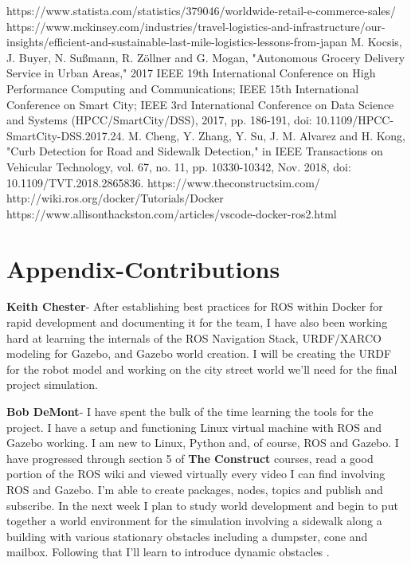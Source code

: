 \documentclass{article}
\begin{document}
\begin{multicols}{2}

\begin{thebibliography}{10}
 https://www.statista.com/statistics/379046/worldwide-retail-e-commerce-sales/
https://www.mckinsey.com/industries/travel-logistics-and-infrastructure/our-insights/efficient-and-sustainable-last-mile-logistics-lessons-from-japan
M. Kocsis, J. Buyer, N. Sußmann, R. Zöllner and G. Mogan, "Autonomous Grocery Delivery Service in Urban Areas," 2017 IEEE 19th International Conference on High Performance Computing and Communications; IEEE 15th International Conference on Smart City; IEEE 3rd International Conference on Data Science and Systems (HPCC/SmartCity/DSS), 2017, pp. 186-191, doi: 10.1109/HPCC-SmartCity-DSS.2017.24.
M. Cheng, Y. Zhang, Y. Su, J. M. Alvarez and H. Kong, "Curb Detection for Road and Sidewalk Detection," in IEEE Transactions on Vehicular Technology, vol. 67, no. 11, pp. 10330-10342, Nov. 2018, doi: 10.1109/TVT.2018.2865836.
 https://www.theconstructsim.com/
 http://wiki.ros.org/docker/Tutorials/Docker
 https://www.allisonthackston.com/articles/vscode-docker-ros2.html



\end{thebibliography}
\pagebreak
\section*{Appendix-Contributions}
\noindent \textbf{Keith Chester}-  After establishing best practices for ROS within Docker for rapid development and documenting it for the team, I have also been working hard at learning the internals of the ROS Navigation Stack, URDF/XARCO modeling for Gazebo, and Gazebo world creation. I will be creating the URDF for the robot model and working on the city street world we'll need for the final project simulation.

\bigskip

\noindent \textbf{Bob DeMont}- I have spent the bulk of the time learning the tools for the project.  I have a setup and functioning Linux virtual machine with ROS and Gazebo working.  I am new to Linux, Python and, of course, ROS and Gazebo.  I have progressed through section 5 of \textbf{The Construct} courses, read a good portion of the ROS wiki and viewed virtually every video I can find involving ROS and Gazebo.  I'm able to create packages, nodes, topics and publish and subscribe.  In the next week I plan to study world development and begin to put together a world environment for the simulation involving a sidewalk along a building with various stationary obstacles including a dumpster, cone and mailbox.  Following that I'll learn to introduce dynamic obstacles .\\

\end{multicols}
\end{document}
